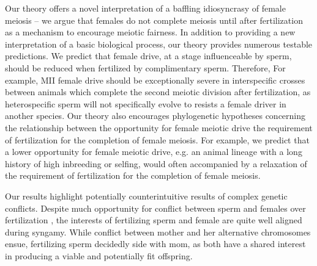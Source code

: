\documentclass{pnastwo}
\begin{document}
\begin{article}
Our theory offers a novel interpretation of a baffling idiosyncrasy of female meiosis -- 
	we argue that females do not complete meiosis until after fertilization as a mechanism to encourage meiotic fairness. 
In addition to providing a new interpretation of a basic biological process, our theory provides numerous testable predictions. 
We predict that female drive, at a stage influenceable by sperm,  
	should be reduced when fertilized by
	complimentary sperm. 
Therefore, For example, MII female drive should be exceptionally severe in
	interspecific crosses between animals which complete the second meiotic division after fertilization,  
	as heterospecific sperm will not specifically evolve to resists a female driver in another species. 
Our theory also encourages phylogenetic hypotheses concerning the relationship between the opportunity 
	for female meiotic drive the requirement of fertilization for the completion of female meiosis. 
For example, we predict that a lower opportunity for female meiotic drive,
        e.g. an animal lineage with a long history of high inbreeding
        or selfing, 
        would often accompanied by a relaxation of the requirement of fertilization for the
        completion of female meiosis.


Our results highlight potentially counterintuitive results of complex genetic conflicts. 
Despite much opportunity for conflict between sperm and females over fertilization \cite{Partridge1998},
	the interests of fertilizing sperm and female are quite well aligned during syngamy.
While conflict between mother and her alternative chromosomes ensue, 
	fertilizing sperm decidedly side with mom, as both have a shared interest in producing a viable and potentially fit offspring. 



\end{article}
\end{document}
